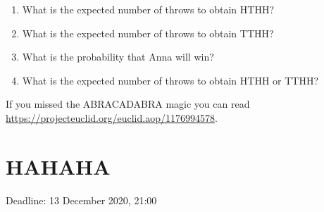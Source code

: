 \documentclass[12pt]{article}
\begin{document}
\begin{enumerate}
\begin{enumerate}
  \item What is the expected number of throws to obtain HTHH? 
  \item What is the expected number of throws to obtain TTHH?
  \item What is the probability that Anna will win?
  \item What is the expected number of throws to obtain HTHH or TTHH?
\end{enumerate}

If you missed the ABRACADABRA magic you can read \url{https://projecteuclid.org/euclid.aop/1176994578}.

\end{enumerate}





\newpage
\section{HAHAHA}


Deadline: 13 December 2020, 21:00
\end{document}
